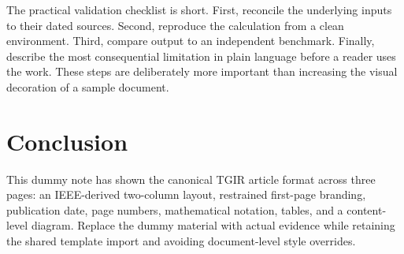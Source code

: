 \documentclass[conference]{IEEEtran}
\begin{document}
\lipsum[6-8]

The practical validation checklist is short. First, reconcile the underlying
inputs to their dated sources. Second, reproduce the calculation from a clean
environment. Third, compare output to an independent benchmark. Finally,
describe the most consequential limitation in plain language before a reader
uses the work. These steps are deliberately more important than increasing the
visual decoration of a sample document.

\lipsum[10-13]

\lipsum[14-17]

\section{Conclusion}

\lipsum[9]

This dummy note has shown the canonical TGIR article format across three pages:
an IEEE-derived two-column layout, restrained first-page branding, publication
date, page numbers, mathematical notation, tables, and a content-level diagram.
Replace the dummy material with actual evidence while retaining the shared
template import and avoiding document-level style overrides.
\end{document}
